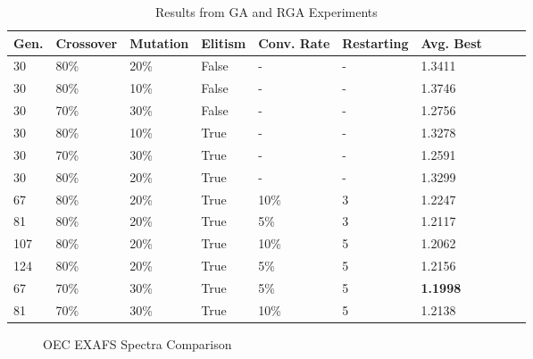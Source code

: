 \documentclass[conference]{IEEEtran}
\begin{document}
\begin{table}
  \caption{Results from GA and RGA Experiments}
  \label{table:sampleRuns}
  \centering
  \begin{tabular}{ | l | l | l | l | l | l | l | l | l | l | }
    \hline
    Gen. & Crossover & Mutation & Elitism & Conv. Rate & Restarting &  Avg. Best \\ \hline \hline
    30 & 80\% & 20\% & False & - & - & 1.3411 \\ \hline
    30 & 80\% & 10\% & False & - & - & 1.3746 \\ \hline
    30 & 70\% & 30\% & False & - & - & 1.2756 \\ \hline
    30 & 80\% & 10\% & True & - & - & 1.3278 \\ \hline
    30 & 70\% & 30\% & True & - & - & 1.2591 \\ \hline
    30 & 80\% & 20\% & True & - & - & 1.3299 \\ \hline
    67 & 80\% & 20\% & True & 10\% & 3 & 1.2247 \\ \hline
    81 & 80\% & 20\% & True & 5\% & 3 & 1.2117 \\ \hline
    107 & 80\% & 20\% & True & 10\% & 5 & 1.2062 \\ \hline
    124 & 80\% & 20\% & True & 5\% & 5 & 1.2156 \\ \hline
    67 & 70\% & 30\% & True & 5\% & 5 & \textbf{1.1998} \\ \hline
    81 & 70\% & 30\% & True & 10\% & 5 & 1.2138 \\ \hline
  \end{tabular}
\end{table}

\begin{figure}
\begin{center}
\end{center}
\caption{OEC EXAFS Spectra Comparison}
\label{fig:bestRunEXAFS}
\end{figure}
\end{document}
